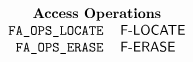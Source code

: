 
\normalsize
\[\begin{tabular}{rl}
    \multicolumn{2}{c}{\bf Access Operations}\\
    \tt FA\_OPS\_LOCATE&	\sf F-LOCATE\\
    \tt FA\_OPS\_ERASE&		\sf F-ERASE\\
\end{tabular}\]
